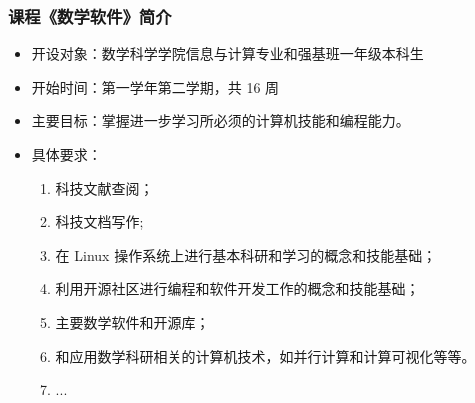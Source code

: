 \documentclass{beamer}
\begin{document}
\begin{frame}
    \frametitle{课程《数学软件》简介} 
\begin{itemize}
    \item<1-> 开设对象：数学科学学院信息与计算专业和强基班一年级本科生
    \item<1-> 开始时间：第一学年第二学期，共 16 周
    \item<1-> 主要目标：掌握进一步学习所必须的计算机技能和编程能力。
    \item<2-> 具体要求：
        \begin{enumerate} \tiny
            \item 科技文献查阅；
            \item 科技文档写作;
            \item 在 Linux 操作系统上进行基本科研和学习的概念和技能基础；
            \item 利用开源社区进行编程和软件开发工作的概念和技能基础；
            \item 主要数学软件和开源库；
            \item 和应用数学科研相关的计算机技术，如并行计算和计算可视化等等。
            \item ...
        \end{enumerate}
\end{itemize}    
\end{frame}
\end{document}
